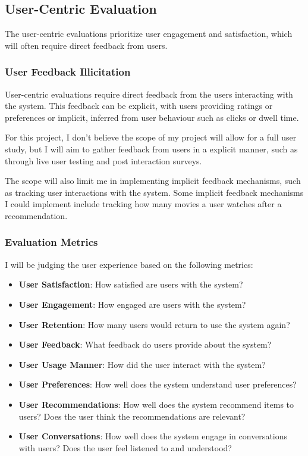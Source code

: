 

\subsection{User-Centric Evaluation}
The user-centric evaluations prioritize user engagement and satisfaction, which will often require direct feedback from users.

\subsubsection{User Feedback Illicitation}
User-centric evaluations require direct feedback from the users interacting with the system. 
This feedback can be explicit, with users providing ratings or preferences or implicit, inferred from user behaviour such as clicks or dwell time.

For this project, I don't believe the scope of my project will allow for a full user study,
but I will aim to gather feedback from users in a explicit manner, such as through live user testing and post interaction surveys.

The scope will also limit me in implementing implicit feedback mechanisms, such as tracking user interactions with the system.
Some implicit feedback mechanisms I could implement include tracking how many movies a user watches after a recommendation.


\subsubsection{Evaluation Metrics}
I will be judging the user experience based on the following metrics:
\begin{itemize}
    \item \textbf{User Satisfaction}: How satisfied are users with the system?
    \item \textbf{User Engagement}: How engaged are users with the system?
    \item \textbf{User Retention}: How many users would return to use the system again?
    \item \textbf{User Feedback}: What feedback do users provide about the system?
    \item \textbf{User Usage Manner}: How did the user interact with the system?
    \item \textbf{User Preferences}: How well does the system understand user preferences?
    \item \textbf{User Recommendations}: How well does the system recommend items to users? Does the user think the recommendations are relevant?
    \item \textbf{User Conversations}: How well does the system engage in conversations with users? Does the user feel listened to and understood?
\end{itemize}


